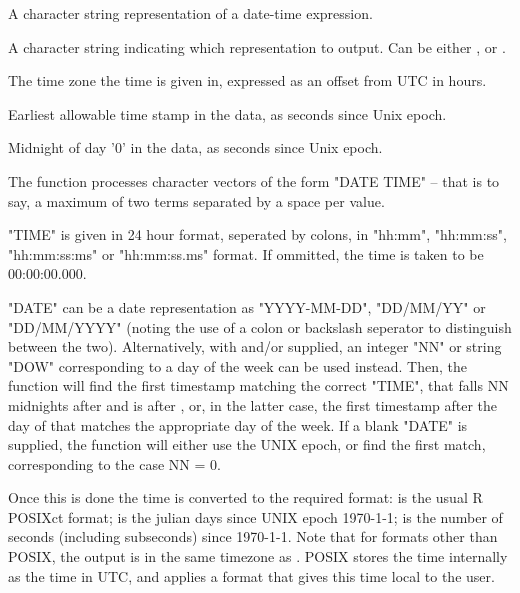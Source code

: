 \documentclass[a4paper]{book}
\begin{document}
%
\begin{Arguments}
\begin{ldescription}
\item[\code{t}] A character string representation of a date-time expression.
\item[\code{format}] A character string indicating which representation to output.  Can be either ,  or .
\item[\code{tzone}] The time zone the time is given in, expressed as an offset from UTC in hours.
\item[\code{start}] Earliest allowable time stamp in the data, as seconds since Unix epoch.
\item[\code{startmidnight}] Midnight of day '0' in the data, as seconds since Unix epoch.
\end{ldescription}
\end{Arguments}
%
\begin{Details}\relax
The function processes character vectors of the form "DATE TIME" -- that is to say, a maximum of two terms separated by a space per value. 

"TIME" is given in 24 hour format, seperated by colons, in "hh:mm", "hh:mm:ss", "hh:mm:ss:ms" or "hh:mm:ss.ms" format. If ommitted, the time is taken to be 00:00:00.000.

"DATE" can be a date representation as "YYYY-MM-DD", "DD/MM/YY" or "DD/MM/YYYY" (noting the use of a colon or backslash seperator to distinguish between the two). Alternatively, with  and/or  supplied, an integer "NN" or string "DOW" corresponding to a day of the week can be used instead. Then, the function will find the first timestamp matching the correct "TIME", that falls NN midnights after  and is after , or, in the latter case, the first timestamp after the day of  that matches the appropriate day of the week. If a blank "DATE" is supplied, the function will either use the UNIX epoch, or find the first match, corresponding to the case NN = 0.

Once this is done the time is converted to the required format:  is the usual R POSIXct format;  is the julian days since UNIX epoch 1970-1-1;  is the number of seconds (including subseconds) since 1970-1-1. Note that for formats other than POSIX, the output is in the same timezone as . POSIX stores the time internally as the time in UTC, and applies a format that gives this time local to the user.
\end{Details}
\end{document}
